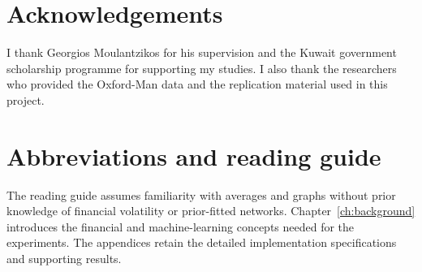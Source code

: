 \chapter*{Acknowledgements}
I thank Georgios Moulantzikos for his supervision and the Kuwait government scholarship programme for supporting my studies. I also thank the researchers who provided the Oxford-Man data and the replication material used in this project.

\chapter*{Abbreviations and reading guide}
The reading guide assumes familiarity with averages and graphs without prior knowledge of financial volatility or prior-fitted networks. Chapter~\ref{ch:background} introduces the financial and machine-learning concepts needed for the experiments. The appendices retain the detailed implementation specifications and supporting results.

